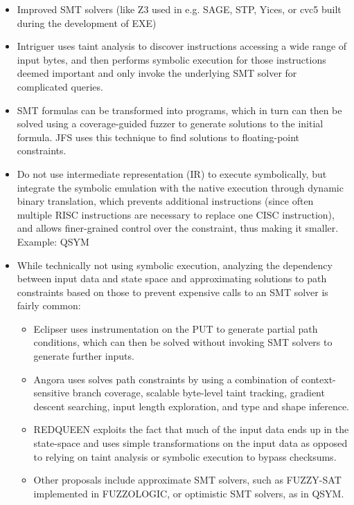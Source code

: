 \documentclass{article}
\begin{document}
\begin{multicols}{2}
\begin{itemize}
    \item Improved SMT solvers (like Z3\cite{Z3} used in e.g. SAGE\cite{SAGE}, STP\cite{STP}, Yices\cite{Yices}, or cvc5\cite{CVC5} built during the development of EXE\cite{EXE})
    \item Intriguer\cite{Intriguer} uses taint analysis to discover instructions accessing a wide range of input bytes, and then performs symbolic execution for those instructions deemed important and only invoke the underlying SMT solver for complicated queries.
    \item SMT formulas can be transformed into programs, which in turn can then be solved using a coverage-guided fuzzer to generate solutions to the initial formula. JFS\cite{JFS} uses this technique to find solutions to floating-point constraints.
    \item Do not use intermediate representation (IR) to execute symbolically, but integrate the symbolic emulation with the native execution through dynamic binary translation, which prevents additional instructions (since often multiple RISC instructions are necessary to replace one CISC instruction), and allows finer-grained control over the constraint, thus making it smaller. Example: QSYM\cite{QSYM}
    \item While technically not using symbolic execution, analyzing the dependency between input data and state space and approximating solutions to path constraints based on those to prevent expensive calls to an SMT solver is fairly common\cite{WEIZZ}:
          \begin{itemize}
            \item Eclipser\cite{Eclipser} uses instrumentation on the PUT to generate partial path conditions, which can then be solved without invoking SMT solvers to generate further inputs.
            \item Angora\cite{Angora} uses solves path constraints by using a combination of context-sensitive branch coverage, scalable byte-level taint tracking, gradient descent searching, input length exploration, and type and shape inference.
            \item REDQUEEN\cite{REDQUEEN} exploits the fact that much of the input data ends up in the state-space and uses simple transformations on the input data as opposed to relying on taint analysis or symbolic execution to bypass checksums.
            \item Other proposals include approximate SMT solvers, such as FUZZY-SAT implemented in FUZZOLOGIC\cite{FUZZOLIC}, or optimistic SMT solvers, as in QSYM\cite{QSYM}.
          \end{itemize}
  \end{itemize}


\end{multicols}
\end{document}
